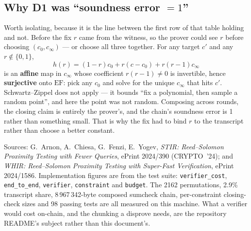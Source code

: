 \documentclass[11pt,a4paper]{article}
\begin{document}
\subsection*{Why D1 was ``soundness error $=1$''}

Worth isolating, because it is the line between the first row of that table holding and not. Before
the fix $r$ came from the witness, so the prover could see $r$ before choosing
$(c_{0},c_{\infty})$ --- or choose all three together. For any target $c'$ and any $r\notin\{0,1\}$,
\[
  h(r)=(1-r)c_{0}+r(c-c_{0})+r(r-1)c_{\infty}
\]
is an \textbf{affine} map in $c_{\infty}$ whose coefficient $r(r-1)\neq0$ is invertible, hence
\textbf{surjective} onto $\mathrm{EF}$: pick any $c_{0}$ and solve for the unique $c_{\infty}$ that
hits $c'$. Schwartz--Zippel does not apply --- it bounds ``fix a polynomial, then sample a random
point'', and here the point was not random. Composing across rounds, the closing claim is entirely
the prover's, and the chain's soundness error is 1 rather than something small. That is why the fix
had to bind $r$ to the transcript rather than choose a better constant.

\vspace{1.5em}
\noindent{\color{rule}\rule{\linewidth}{0.6pt}}
\par\vspace{0.5em}
\noindent\footnotesize\color{muted}
Sources: G.~Arnon, A.~Chiesa, G.~Fenzi, E.~Yogev, \emph{STIR: Reed--Solomon Proximity Testing with
Fewer Queries}, ePrint 2024/390 (CRYPTO~'24); and \emph{WHIR: Reed--Solomon Proximity Testing with
Super-Fast Verification}, ePrint 2024/1586. Implementation figures are from the test suite:
\texttt{verifier\_cost}, \texttt{end\_to\_end}, \texttt{verifier},
\texttt{constraint} and \texttt{budget}. The 2162 permutations, 2.9\% transcript share, 8\,967\,342-byte
composed sumcheck chain, per-constraint closing-check sizes and 98 passing tests are all measured on
this machine. What a verifier would cost on-chain, and the
chunking a disprove needs, are the repository README's subject rather than this document's.
\end{document}
